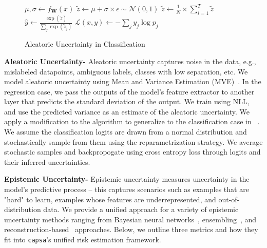 \documentclass{article} %
\def\capsa{\texttt{{capsa}}}
\begin{document}
\begin{wrapfigure}[10]{R}{0.5\textwidth}
\begin{minipage}{0.48\textwidth}
\vspace{-20pt}
\begin{algorithm}[H]
    \centering
    \small
    \caption{\small{Aleatoric Uncertainty in Classification}}
    \label{alg:class-mve}
    \begin{algorithmic}[1]
        \State $\mu, \sigma \leftarrow f_{\bm{W}}(x)$ 
         
        \State $\tilde{z} \leftarrow \mu + \sigma \times \epsilon \sim \mathcal{N}(0, 1)$
        \EndFor
        \State $\tilde{z} \leftarrow \frac{1}{N} \times \sum_{i = 1}^{T} \tilde{z}$ 
        \State $\hat y \leftarrow \frac{\exp(\tilde{z})}{\sum_j \exp(\tilde{z}_j)}$ 
        \State $\mathcal{L}(x, y) \leftarrow -\sum_j y_j \log p_j$ 
    \end{algorithmic}
\end{algorithm}
\end{minipage}
\end{wrapfigure}

\textbf{Aleatoric Uncertainty- }  
%
Aleatoric uncertainty captures noise in the data, e.g., mislabeled datapoints, ambiguous labels, classes with low separation, etc. We model aleatoric uncertainty using Mean and Variance Estimation (MVE)~\citep{nix1994estimating}. In the regression case, we pass the outputs of the model's feature extractor to another layer that predicts the standard deviation of the output. We train using NLL, and use the predicted variance as an estimate of the aleatoric uncertainty. We apply a modification to the algorithm to generalize to the classification case in ~. We assume the classification logits are drawn from a normal distribution and stochastically sample from them using the reparametrization strategy. We average stochastic samples and backpropogate using cross entropy loss through logits and their inferred uncertainties.



\textbf{Epistemic Uncertainty- }
%
Epistemic uncertainty measures uncertainty in the model's predictive process -- this captures scenarios such as examples that are "hard" to learn, examples whose features are underrepresented, and out-of-distribution data. We provide a unified approach for a variety of epistemic uncertainty methods ranging from Bayesian neural networks~\citep{blundell2015weight}, ensembling~\citep{lakshminarayanan2017simple}, and reconstruction-based~\citep{kingma2013auto} approaches. Below, we outline three metrics and how they fit into \capsa's unified risk estimation framework.  
\end{document}
